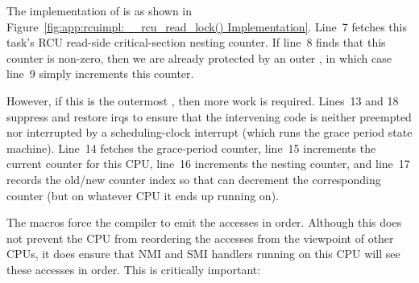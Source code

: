 The implementation of  is as shown in
Figure~\ref{fig:app:rcuimpl:__rcu_read_lock() Implementation}.
Line~7 fetches this task's RCU read-side critical-section nesting
counter.
If line~8 finds that this counter is non-zero,
then we are already protected by an outer
, in which case line~9 simply increments
this counter.

However, if this is the outermost ,
then more work is required.
Lines~13 and 18 suppress and restore irqs to ensure that the
intervening code is neither preempted nor interrupted by a
scheduling-clock interrupt (which runs the grace period state machine).
Line~14 fetches the grace-period counter,
line~15 increments the current counter for
this CPU, line~16 increments the nesting counter,
and line~17 records the old/new counter index so that
 can decrement the corresponding
counter (but on whatever CPU it ends up running on).

The  macros force the compiler to
emit the accesses in order.
Although this does not prevent the CPU from reordering the accesses
from the viewpoint of other CPUs, it does ensure that NMI and
SMI handlers running on this CPU will see these accesses in order.
This is critically important:
\fi

